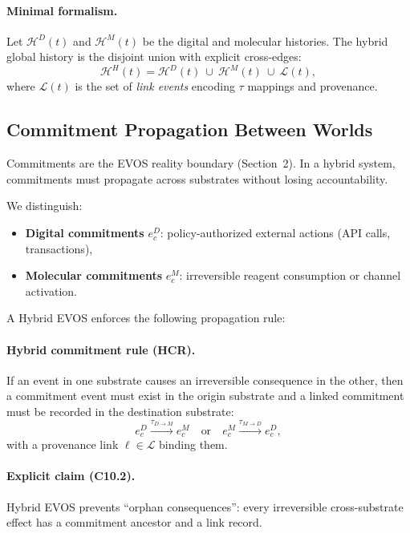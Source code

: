 \documentclass[11pt]{article}
\begin{document}
\paragraph{Minimal formalism.}
Let $\mathcal{H}^D(t)$ and $\mathcal{H}^M(t)$ be the digital and molecular histories. The
hybrid global history is the disjoint union with explicit cross-edges:
\[
\mathcal{H}^{H}(t)=\mathcal{H}^D(t)\ \cup\ \mathcal{H}^M(t)\ \cup\ \mathcal{L}(t),
\]
where $\mathcal{L}(t)$ is the set of \emph{link events} encoding $\tau$ mappings and
provenance.

\subsection{Commitment Propagation Between Worlds}
\label{sec:commitment-propagation}

Commitments are the EVOS reality boundary (Section~2). In a hybrid system, commitments
must propagate across substrates without losing accountability.

We distinguish:

\begin{itemize}
  \item \textbf{Digital commitments} $e_c^D$: policy-authorized external actions (API calls, transactions),
  \item \textbf{Molecular commitments} $e_c^M$: irreversible reagent consumption or channel activation.
\end{itemize}

A Hybrid EVOS enforces the following propagation rule:

\paragraph{Hybrid commitment rule (HCR).}
If an event in one substrate causes an irreversible consequence in the other, then a
commitment event must exist in the origin substrate and a linked commitment must be
recorded in the destination substrate:
\[
e_c^D \xrightarrow{\tau_{D\rightarrow M}} e_c^M
\quad\text{or}\quad
e_c^M \xrightarrow{\tau_{M\rightarrow D}} e_c^D,
\]
with a provenance link $\ell\in\mathcal{L}$ binding them.

\paragraph{Explicit claim (C10.2).}
Hybrid EVOS prevents ``orphan consequences'': every irreversible cross-substrate effect
has a commitment ancestor and a link record.
\end{document}
